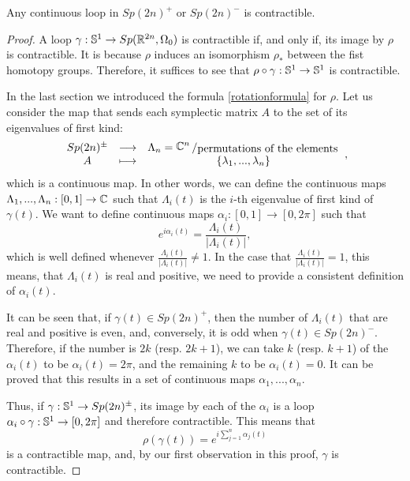 \begin{theo}
Any continuous loop in $Sp(2n)^+$ or $Sp(2n)^-$ is contractible. 
\end{theo}

\begin{proof}
A loop $\gamma : \mathbb{S}^1 \rightarrow Sp(\mathbb{R}^{2n},\Omega_0)$ is contractible if, and only if, its image by $\rho$ is contractible. It is because $\rho$ induces an isomorphism $\rho_{\ast}$ between the fist homotopy groups. Therefore, it suffices to see that $\rho \circ \gamma : \mathbb{S}^1 \rightarrow \mathbb{S}^1$ is contractible.

In the last section we introduced the formula \ref{rotationformula} for $\rho$. Let us consider the map that sends each symplectic matrix $A$ to the set of its eigenvalues of first kind:
\[\begin{array}{ccc} Sp(2n)^{\pm} & \longrightarrow & \Lambda_n = \quocient{\C^n}{\text{permutations of the elements}} \\ A & \longmapsto & \{\lambda_1,...,\lambda_n\} \end{array} ,\]
which is a continuous map. In other words, we can define the continuous maps $\Lambda_1,...,\Lambda_n : [0,1] \rightarrow \mathbb{C}$ such that $\Lambda_i(t)$ is the $i$-th eigenvalue of first kind of $\gamma(t)$. We want to define continuous maps $\alpha_i : [0,1] \rightarrow [0,2\pi]$ such that
\[e^{i \alpha_i(t)} = \frac{\Lambda_i(t)}{|\Lambda_i(t)|} ,\]
which is well defined whenever $\frac{\Lambda_i(t)}{|\Lambda_i(t)|} \neq 1$. In the case that $\frac{\Lambda_i(t)}{|\Lambda_i(t)|} = 1$, this means, that $\Lambda_i(t)$ is real and positive, we need to provide a consistent definition of $\alpha_i(t)$.

It can be seen that, if $\gamma(t) \in Sp(2n)^+$, then the number of $\Lambda_i(t)$ that are real and positive is even, and, conversely, it is odd when $\gamma(t) \in Sp(2n)^-$. Therefore, if the number is $2k$ (resp. $2k+1$), we can take $k$ (resp. $k+1$) of the $\alpha_i(t)$ to be $\alpha_i(t) = 2\pi$, and the remaining $k$ to be $\alpha_i(t) = 0$. It can be proved that this results in a set of continuous maps $\alpha_1,...,\alpha_n$.

Thus, if $\gamma : \mathbb{S}^1 \rightarrow Sp(2n)^{\pm}$, its image by each of the $\alpha_i$ is a loop $\alpha_i \circ \gamma : \mathbb{S}^1 \rightarrow [0,2\pi]$ and therefore contractible. This means that
\[\rho(\gamma(t)) = e^{i \sum_{j=1}^n \alpha_j(t)}\]
is a contractible map, and, by our first observation in this proof, $\gamma$ is contractible.
\end{proof}

